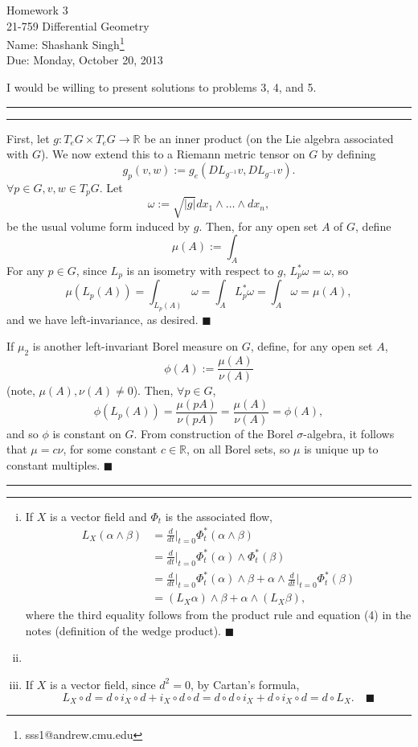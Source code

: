 \documentclass[11pt]{article}
\makeatletter
\newcounter{questionCounter}
\newcounter{partCounter}[questionCounter]
\newenvironment{question}[2][\arabic{questionCounter}]{%
    \setcounter{partCounter}{0}%
    \vspace{.25in} \hrule \vspace{0.5em}%
        \noindent{\bf #2}%
    \vspace{0.8em} \hrule \vspace{.10in}%
    \addtocounter{questionCounter}{1}%
}{}
\newcommand{\myname}{Shashank Singh}
\newcommand{\myandrew}{sss1@andrew.cmu.edu}
\newcommand{\myclass}{21-759 Differential Geometry}
\newcommand{\myhwnum}{3}
\newcommand{\duedate}{Monday, October 20, 2013}
\renewcommand{\qed}{\quad \ensuremath{\blacksquare}}    %
\newcommand{\inv}{^{-1}}                %
\newcommand{\R}{\mathbb{R}}             %
\makeatother
\begin{document}
\thispagestyle{plain}

{\Large Homework \myhwnum} \\
\myclass \\
Name: \myname\footnote{\myandrew} \\
Due: \duedate

I would be willing to present solutions to problems 3, 4, and 5.

\begin{question}{Problem 1}
First, let $g : T_eG \times T_eG \to \R$ be an inner product (on the Lie
algebra associated with $G$). We now extend this to a Riemann metric tensor on
$G$ by defining
\[g_p(v,w) := g_e(DL_{g\inv} v, DL_{g\inv} v).\]
$\forall p \in G, v,w \in T_pG$.
Let
\[\omega := \sqrt{|g|} dx_1 \wedge \dots \wedge dx_n,\]
be the usual volume form induced by $g$. Then, for any open set $A$ of $G$,
define
\[\mu(A) := \int_A\]
For any $p \in G$, since $L_p$ is an isometry with respect to $g$,
$L_p^*\omega = \omega$, so
\[\mu(L_p(A))
    = \int_{L_p(A)} \omega
    = \int_A L_p^*\omega
    = \int_A \omega
    = \mu(A),
\]
and we have left-invariance, as desired. \qed

If $\mu_2$ is another left-invariant Borel measure on $G$, define, for any open
set $A$,
\[\phi(A) := \frac{\mu(A)}{\nu(A)}\]
(note, $\mu(A),\nu(A) \neq 0$). Then, $\forall p \in G$,
\[\phi(L_p(A))
    = \frac{\mu(pA)}{\nu(pA)}
    = \frac{\mu(A)}{\nu(A)}
    = \phi(A),\]
and so $\phi$ is constant on $G$. From construction of the Borel
$\sigma$-algebra, it follows that $\mu = c\nu$, for some constant $c \in \R$,
on all Borel sets, so $\mu$ is unique up to constant multiples. \qed
\end{question}

\newpage
\begin{question}{Problem 2}
\begin{enumerate}[(i)]
\item If $X$ is a vector field and $\Phi_t$ is the associated flow,
\begin{align*}
L_X(\alpha \wedge \beta)
 &  = \frac{d}{dt} \bigg|_{t = 0} \Phi_t^*(\alpha \wedge \beta)             \\
 &  = \frac{d}{dt} \bigg|_{t = 0} \Phi_t^*(\alpha) \wedge \Phi_t^*(\beta)   \\
 &  = \frac{d}{dt} \bigg|_{t = 0} \Phi_t^*(\alpha) \wedge \beta
        + \alpha \wedge \frac{d}{dt} \bigg|_{t = 0} \Phi_t^*(\beta)         \\
 &  = (L_X\alpha) \wedge \beta + \alpha \wedge (L_X\beta),
\end{align*}
where the third equality follows from the product rule and equation (4) in the
notes (definition of the wedge product). \qed

\item

\item If $X$ is a vector field, since $d^2 = 0$, by Cartan's formula,
\[L_X \circ d
    = d \circ i_X \circ d + i_X \circ d \circ d
    = d \circ d \circ i_X + d \circ i_X \circ d
    = d \circ L_X. \qed
\]

\end{enumerate}
\end{question}
\end{document}
